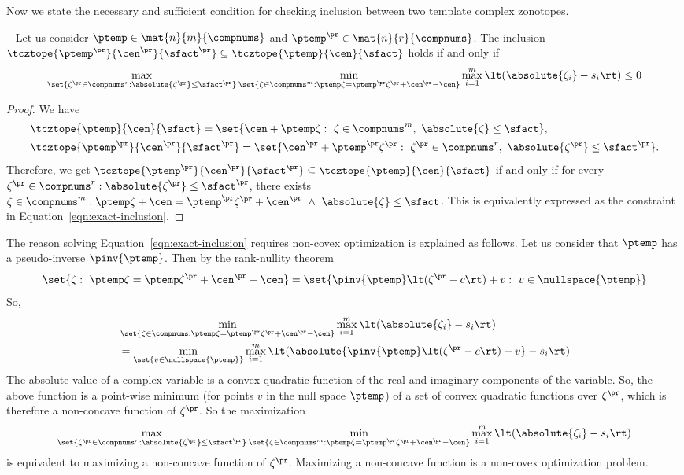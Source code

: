 Now we state the necessary and sufficient condition for checking
inclusion between two template complex zonotopes.
%
\begin{lemma}~\label{lem:exact-inclusion}
Let us consider $\ptemp\in\mat{n}{m}{\compnums}$ and
$\ptemp^\pr\in\mat{n}{r}{\compnums}$.  The inclusion
$\tcztope{\ptemp^\pr}{\cen^\pr}{\sfact^\pr}\subseteq\tcztope{\ptemp}{\cen}{\sfact}$
holds if and only if
\begin{equation}\label{eqn:exact-inclusion}
\max_{\set{\zeta^\pr\in\compnums^{r}:\absolute{\zeta^\pr}\leq \sfact^\pr}}\min_{\set{\zeta\in\compnums^m:\ptemp\zeta=\ptemp^\pr\zeta^\pr+\cen^\pr-\cen}}\max_{i=1}^m\lt(\absolute{\zeta_i}-s_i\rt)\leq 0
\end{equation}
\end{lemma}
%
\begin{proof}
  We have
  \begin{align*}
    &\tcztope{\ptemp}{\cen}{\sfact}=\set{\cen+\ptemp\zeta:~\zeta\in\compnums^m,~\absolute{\zeta}\leq\sfact},\\
    &\tcztope{\ptemp^\pr}{\cen^\pr}{\sfact^\pr}=\set{\cen^\pr+\ptemp^\pr\zeta^\pr:~\zeta^\pr\in\compnums^r,~\absolute{\zeta^\pr}\leq\sfact^\pr}.
  \end{align*}
Therefore, we get
$\tcztope{\ptemp^\pr}{\cen^\pr}{\sfact^\pr}\subseteq\tcztope{\ptemp}{\cen}{\sfact}$
if and only if
for every $\zeta^\pr\in\compnums^r:\absolute{\zeta^\pr}\leq \sfact^\pr$,
there exists
$\zeta\in\compnums^m:\ptemp\zeta+\cen=\ptemp^\pr\zeta^\pr+\cen^\pr~\wedge~\absolute{\zeta}\leq
\sfact$.  This is equivalently expressed as the constraint in Equation~\ref{eqn:exact-inclusion}.
\end{proof}
%
The reason solving Equation~\ref{eqn:exact-inclusion}
requires non-covex optimization is explained as follows.  Let us consider
that $\ptemp$ has a pseudo-inverse $\pinv{\ptemp}$.  Then by the
rank-nullity theorem
%
\[
\set{\zeta:~\ptemp\zeta=\ptemp\zeta^\pr+\cen^\pr-\cen}=\set{\pinv{\ptemp}\lt(\zeta^\pr-c\rt)+v:~v\in\nullspace{\ptemp}}
\]
%
So,
%
\begin{align*}
& \min_{\set{\zeta\in\compnums:\ptemp\zeta=\ptemp^\pr\zeta^\pr+\cen^\pr-\cen}}\max_{i=1}^m\lt(\absolute{\zeta_i}-s_i\rt)\\
&
=\min_{\set{v\in\nullspace{\ptemp}}}\max_{i=1}^m\lt(\absolute{\pinv{\ptemp}\lt(\zeta^\pr-c\rt)+v}-s_i\rt)
\end{align*}
%
The absolute value of a complex variable is a convex quadratic
function of the real and imaginary components of the variable.  So,
the above function is a point-wise minimum (for points $v$ in the null
space $\null{\ptemp}$) of a set of convex quadratic functions over
$\zeta^\pr$, which is therefore a non-concave function of $\zeta^\pr$.
So the maximization
%
\[
\max_{\set{\zeta^\pr\in\compnums^{r}:\absolute{\zeta^\pr}\leq \sfact^\pr}}\min_{\set{\zeta\in\compnums^m:\ptemp\zeta=\ptemp^\pr\zeta^\pr+\cen^\pr-\cen}}\max_{i=1}^m\lt(\absolute{\zeta_i}-s_i\rt)
\]
%
is equivalent to maximizing a non-concave function of $\zeta^\pr$.
Maximizing a non-concave function is a non-covex optimization problem.

